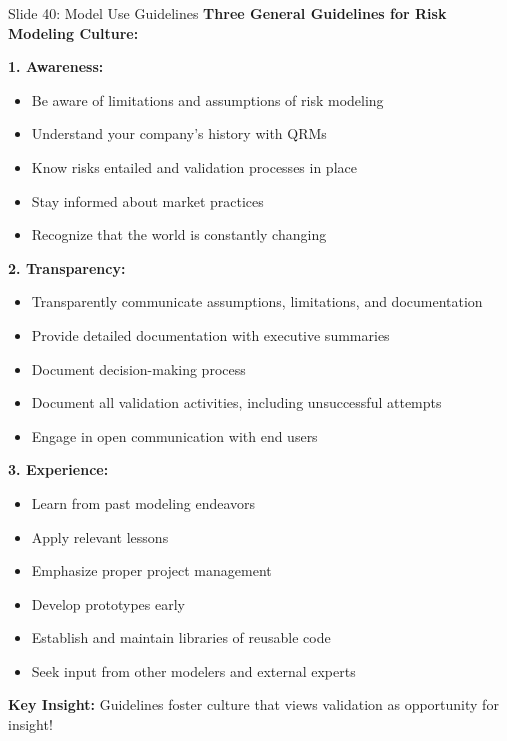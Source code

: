 \documentclass[8pt]{beamer}
\begin{document}
	\begin{frame}{Slide 40: Model Use Guidelines}
		\fontsize{6.5}{7.5}\selectfont
		\textbf{Three General Guidelines for Risk Modeling Culture:}
		
		\vspace{0.1cm}
		\textbf{1. Awareness:}
		\begin{itemize}
			\item Be aware of limitations and assumptions of risk modeling
			\item Understand your company's history with QRMs
			\item Know risks entailed and validation processes in place
			\item Stay informed about market practices
			\item Recognize that the world is constantly changing
		\end{itemize}
		
		\vspace{0.1cm}
		\textbf{2. Transparency:}
		\begin{itemize}
			\item Transparently communicate assumptions, limitations, and documentation
			\item Provide detailed documentation with executive summaries
			\item Document decision-making process
			\item Document all validation activities, including unsuccessful attempts
			\item Engage in open communication with end users
		\end{itemize}
		
		\vspace{0.1cm}
		\textbf{3. Experience:}
		\begin{itemize}
			\item Learn from past modeling endeavors
			\item Apply relevant lessons
			\item Emphasize proper project management
			\item Develop prototypes early
			\item Establish and maintain libraries of reusable code
			\item Seek input from other modelers and external experts
		\end{itemize}
		
		\textcolor{myblue}{\textbf{Key Insight:}} Guidelines foster \textcolor{myblue}{culture that views validation as opportunity for insight}!
	\end{frame}
	
\end{document}
